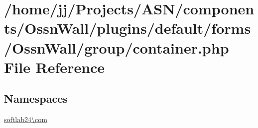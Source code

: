\hypertarget{forms_2_ossn_wall_2group_2container_8php}{}\section{/home/jj/\+Projects/\+A\+S\+N/components/\+Ossn\+Wall/plugins/default/forms/\+Ossn\+Wall/group/container.php File Reference}
\label{forms_2_ossn_wall_2group_2container_8php}
\subsection*{Namespaces}
\begin{DoxyCompactItemize}
\item 
 \hyperlink{namespacesoftlab24_1_1com}{softlab24\textbackslash{}com}
\end{DoxyCompactItemize}
